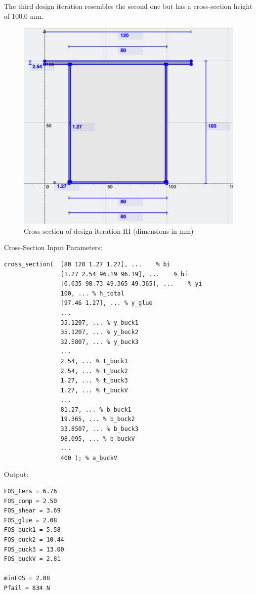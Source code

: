 \documentclass[11pt]{article}
\newcommand{\imagewidth}{.5\linewidth}
\begin{document}
The third design iteration resembles the second one but has a cross-section height of 100.0 mm.

\begin{figure}[h]
    \centering
    \includegraphics[width=\imagewidth]{img/design-3-cs.png}
    \caption{Cross-section of design iteration III (dimensions in mm)}
    \label{d3}
\end{figure}

Cross-Section Input Parameters:
\begin{lstlisting}[]
cross_section(  [80 120 1.27 1.27], ...    % bi
                [1.27 2.54 96.19 96.19], ...    % hi
                [0.635 98.73 49.365 49.365], ...    % yi
                100, ... % h_total
                [97.46 1.27], ... % y_glue
                ...
                35.1207, ... % y_buck1
                35.1207, ... % y_buck2
                32.5807, ... % y_buck3
                ...
                2.54, ... % t_buck1
                2.54, ... % t_buck2
                1.27, ... % t_buck3
                1.27, ... % t_buckV
                ...
                81.27, ... % b_buck1
                19.365, ... % b_buck2
                33.8507, ... % b_buck3
                98.095, ... % b_buckV
                ...
                400 ); % a_buckV
\end{lstlisting}

Output:
\begin{lstlisting}[]
FOS_tens = 6.76
FOS_comp = 2.50
FOS_shear = 3.69
FOS_glue = 2.08
FOS_buck1 = 5.58
FOS_buck2 = 10.44
FOS_buck3 = 13.00
FOS_buckV = 2.81

minFOS = 2.08
Pfail = 834 N
\end{lstlisting}
\end{document}
